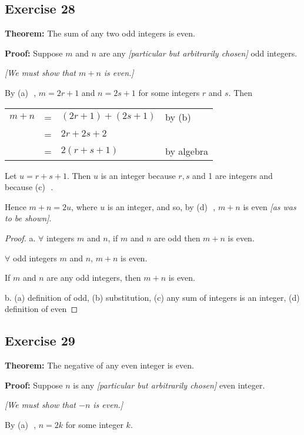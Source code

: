 \documentclass[14pt]{extarticle}
\newcommand{\fbl}{\underline{\hspace{1cm}}\,\,}
\newcommand{\fa}{\forall}
\begin{document}
\subsection{Exercise 28}
{\bf Theorem:} The sum of any two odd integers is even.

{\bf Proof:} Suppose $m$ and $n$ are any {\it [particular but arbitrarily chosen]} odd integers. 

{\it [We must show that $m + n$ is even.]}

By {\color{cyan}(a)} \fbl, $m = 2r + 1$ and $n = 2s + 1$ for some integers $r$ and $s$. Then

\begin{center}
\begin{tabular}{rcll}
$m+n$ & = & $(2r+1) + (2s+1)$ & {\color{cyan} by (b)} \fbl \\
& = & $2r + 2s + 2$ & \\
& = & $2(r+s+1)$ & \color{cyan} by algebra \\
\end{tabular}
\end{center}

Let $u = r + s + 1$. Then $u$ is an integer because $r, s$ and 1 are integers and because {\color{cyan}(c)} \fbl. 

Hence $m + n = 2u$, where $u$ is an integer, and so, by {\color{cyan}(d)} \fbl, $m + n$ is even {\it [as was to be shown]}.

\begin{proof}
a. $\fa$ integers $m$ and $n$, if $m$ and $n$ are odd then $m + n$ is even.

$\fa$ odd integers $m$ and $n$, $m + n$ is even.

If $m$ and $n$ are any odd integers, then $m + n$ is even.

b. (a) definition of odd, (b) substitution, (c) any sum of
integers is an integer, (d) definition of even
\end{proof}

\subsection{Exercise 29}
{\bf Theorem:} The negative of any even integer is even.

{\bf Proof:} Suppose $n$ is any {\it [particular but arbitrarily chosen]} even integer. 

{\it [We must show that $-n$ is even.]}

By {\color{cyan}(a)} \fbl, $n = 2k$ for some integer $k$.
\end{document}
